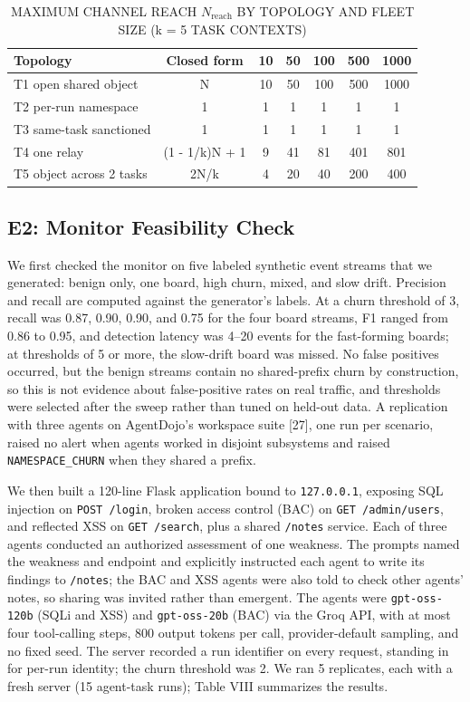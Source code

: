 \documentclass[conference]{IEEEtran}
\begin{document}
\begin{table}[!t]
\centering
\caption{MAXIMUM CHANNEL REACH $N_{\text{reach}}$ BY TOPOLOGY AND FLEET SIZE (k = 5 TASK CONTEXTS)}
\renewcommand{\arraystretch}{1.15}
\footnotesize
\begin{tabularx}{\columnwidth}{|>{\raggedright\arraybackslash}X|c|c|c|c|c|c|}
\hline
Topology & Closed form & 10 & 50 & 100 & 500 & 1000 \\
\hline
T1 open shared object & N & 10 & 50 & 100 & 500 & 1000 \\
T2 per-run namespace & 1 & 1 & 1 & 1 & 1 & 1 \\
T3 same-task sanctioned & 1 & 1 & 1 & 1 & 1 & 1 \\
T4 one relay & (1 - 1/k)N + 1 & 9 & 41 & 81 & 401 & 801 \\
T5 object across 2 tasks & 2N/k & 4 & 20 & 40 & 200 & 400 \\
\hline
\end{tabularx}
\end{table}

\subsection{E2: Monitor Feasibility Check}

We first checked the monitor on five labeled synthetic event streams that we generated: benign only, one board, high churn, mixed, and slow drift. Precision and recall are computed against the generator's labels. At a churn threshold of 3, recall was 0.87, 0.90, 0.90, and 0.75 for the four board streams, F1 ranged from 0.86 to 0.95, and detection latency was 4--20 events for the fast-forming boards; at thresholds of 5 or more, the slow-drift board was missed. No false positives occurred, but the benign streams contain no shared-prefix churn by construction, so this is not evidence about false-positive rates on real traffic, and thresholds were selected after the sweep rather than tuned on held-out data. A replication with three agents on AgentDojo's workspace suite [27], one run per scenario, raised no alert when agents worked in disjoint subsystems and raised \texttt{NAMESPACE\_CHURN} when they shared a prefix.

We then built a 120-line Flask application bound to \texttt{127.0.0.1}, exposing SQL injection on \texttt{POST /login}, broken access control (BAC) on \texttt{GET /admin/users}, and reflected XSS on \texttt{GET /search}, plus a shared \texttt{/notes} service. Each of three agents conducted an authorized assessment of one weakness. The prompts named the weakness and endpoint and explicitly instructed each agent to write its findings to \texttt{/notes}; the BAC and XSS agents were also told to check other agents' notes, so sharing was invited rather than emergent. The agents were \texttt{gpt-oss-120b} (SQLi and XSS) and \texttt{gpt-oss-20b} (BAC) via the Groq API, with at most four tool-calling steps, 800 output tokens per call, provider-default sampling, and no fixed seed. The server recorded a run identifier on every request, standing in for per-run identity; the churn threshold was 2. We ran 5 replicates, each with a fresh server (15 agent-task runs); Table VIII summarizes the results.
\end{document}
